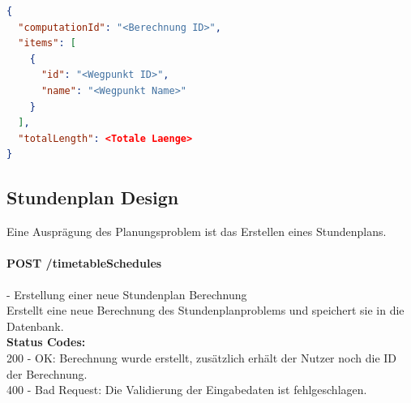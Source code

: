 \begin{lstlisting}[language=JSON, caption=Beispiel eines Endresultates für das Briefträgerproblem, label=lst:solution_postman]  
{
  "computationId": "<Berechnung ID>",
  "items": [
    {
      "id": "<Wegpunkt ID>",
      "name": "<Wegpunkt Name>"
    }
  ],
  "totalLength": <Totale Laenge>
}
\end{lstlisting}

%
%
%
%

\subsection{Stundenplan Design}
Eine Ausprägung des Planungsproblem ist das Erstellen eines Stundenplans.

\paragraph{POST /timetableSchedules} - Erstellung einer neue Stundenplan Berechnung\mbox{}\\
Erstellt eine neue Berechnung des Stundenplanproblems und speichert sie in die Datenbank.\\
\textbf{Status Codes:}\\
200 - OK: Berechnung wurde erstellt, zusätzlich erhält der Nutzer noch die ID der Berechnung.\\
400 - Bad Request: Die Validierung der Eingabedaten ist fehlgeschlagen.\\

